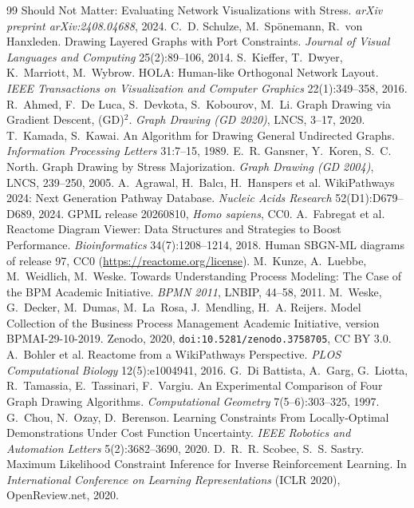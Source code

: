 \documentclass[11pt]{article}
\begin{document}
{\begin{thebibliography}{99}
 Should Not Matter: Evaluating Network Visualizations with Stress. \emph{arXiv preprint
 arXiv:2408.04688}, 2024.
 C.~D. Schulze, M.~Sp\"onemann, R.~von Hanxleden. Drawing Layered Graphs
 with Port Constraints. \emph{Journal of Visual Languages and Computing} 25(2):89--106, 2014.
 S.~Kieffer, T.~Dwyer, K.~Marriott, M.~Wybrow. HOLA: Human-like Orthogonal
 Network Layout. \emph{IEEE Transactions on Visualization and Computer Graphics}
 22(1):349--358, 2016.
 R.~Ahmed, F.~De Luca, S.~Devkota, S.~Kobourov, M.~Li. Graph Drawing via
 Gradient Descent, (GD)$^2$. \emph{Graph Drawing (GD 2020)}, LNCS, 3--17, 2020.
 T.~Kamada, S.~Kawai. An Algorithm for Drawing General Undirected Graphs.
 \emph{Information Processing Letters} 31:7--15, 1989.
 E.~R. Gansner, Y.~Koren, S.~C. North. Graph Drawing by Stress
 Majorization. \emph{Graph Drawing (GD 2004)}, LNCS, 239--250, 2005.
 A.~Agrawal, H.~Balc\i, H.~Hanspers et al. WikiPathways 2024: Next
 Generation Pathway Database. \emph{Nucleic Acids Research} 52(D1):D679--D689, 2024. GPML
 release 20260810, \emph{Homo sapiens}, CC0.
 A.~Fabregat et al. Reactome Diagram Viewer: Data Structures and
 Strategies to Boost Performance. \emph{Bioinformatics} 34(7):1208--1214, 2018. Human
 SBGN-ML diagrams of release 97, CC0 (\url{https://reactome.org/license}).
 M.~Kunze, A.~Luebbe, M.~Weidlich, M.~Weske. Towards Understanding
 Process Modeling: The Case of the BPM Academic Initiative. \emph{BPMN 2011}, LNBIP,
 44--58, 2011.
 M.~Weske, G.~Decker, M.~Dumas, M.~La~Rosa, J.~Mendling, H.~A. Reijers.
 Model Collection of the Business Process Management Academic Initiative, version
 BPMAI-29-10-2019. Zenodo, 2020, \texttt{doi:10.5281/zenodo.3758705}, CC BY 3.0.
 A.~Bohler et al. Reactome from a WikiPathways Perspective. \emph{PLOS
 Computational Biology} 12(5):e1004941, 2016.
 G.~Di Battista, A.~Garg, G.~Liotta, R.~Tamassia, E.~Tassinari, F.~Vargiu.
 An Experimental Comparison of Four Graph Drawing Algorithms. \emph{Computational
 Geometry} 7(5--6):303--325, 1997.
 G.~Chou, N.~Ozay, D.~Berenson. Learning Constraints From Locally-Optimal
 Demonstrations Under Cost Function Uncertainty. \emph{IEEE Robotics and Automation
 Letters} 5(2):3682--3690, 2020.
 D.~R.~R. Scobee, S.~S. Sastry. Maximum Likelihood Constraint Inference
 for Inverse Reinforcement Learning. In \emph{International Conference on Learning
 Representations} (ICLR 2020), OpenReview.net, 2020.

\end{thebibliography}}
\end{document}
